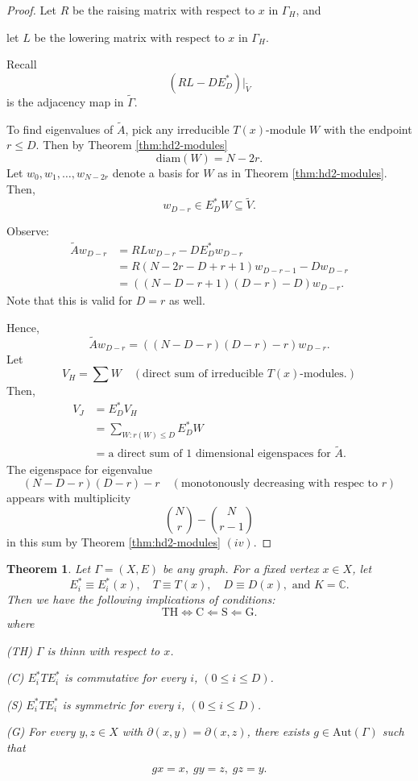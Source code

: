 \documentclass[
]{book}
\newtheorem{theorem}{Theorem}[chapter]
\theoremstyle{definition}
\theoremstyle{definition}
\theoremstyle{definition}
\theoremstyle{definition}
\theoremstyle{remark}
\begin{document}
\begin{proof}
Let \(R\) be the raising matrix with respect to \(x\) in \(\Gamma_H\), and

let \(L\) be the lowering matrix with respect to \(x\) in \(\Gamma_H\).

Recall
\[(RL - DE^*_D) |_{\tilde{V}}\]
is the adjacency map in \(\tilde{\Gamma}\).

To find eigenvalues of \(\tilde{A}\), pick any irreducible \(T(x)\)-module \(W\) with the endpoint \(r\leq D\). Then by Theorem \ref{thm:hd2-modules}
\[\text{diam}(W) = N-2r.\]
Let \(w_0, w_1, \ldots, w_{N-2r}\) denote a basis for \(W\) as in Theorem \ref{thm:hd2-modules}. Then,
\[w_{D-r} \in E^*_DW \subseteq \tilde{V}.\]

Observe:
\begin{align}
\tilde{A}w_{D-r} & = RLw_{D-r} - DE_D^*w_{D-r}\\
& = R(N-2r-D+r+1)w_{D-r-1} - Dw_{D-r}\\
& = ((N-D-r+1)(D-r) - D)w_{D-r}.
\end{align}
Note that this is valid for \(D = r\) as well.

Hence,
\[\tilde{A}w_{D-r}  = ((N-D-r)(D-r)-r)w_{D-r}.\]
Let
\[V_H = \sum W \quad (\text{direct sum of irreducible }T(x)\text{-modules}.)\]
Then,
\begin{align}
V_J & = E_D^*V_H\\
& = \sum_{W:r(W)\leq D} E_D^*W\\
& = \text{a direct sum of 1 dimensional eigenspaces for }\tilde{A}.
\end{align}
The eigenspace for eigenvalue
\[(N-D-r)(D-r)-r \quad (\text{monotonously decreasing with respec to }r)\]
appears with multiplicity
\[\binom{N}{r} - \binom{N}{r-1}\]
in this sum by Theorem \ref{thm:hd2-modules} \((iv)\).
\end{proof}

\begin{theorem}
\protect\hypertarget{thm:thin-condition}{}\label{thm:thin-condition}Let \(\Gamma = (X, E)\) be any graph. For a fixed vertex \(x\in X\), let
\[E_i^*\equiv E_i^*(x), \quad T\equiv T(x), \quad D \equiv D(x), \text{ and } K = \mathbb{C}.\]
Then we have the following implications of conditions:
\[\text{TH} \Leftrightarrow \text{C} \Leftarrow \text{S} \Leftarrow \text{G}.\]
where

(TH) \(\Gamma\) is thinn with respect to \(x\).

(C) \(E^*_iTE^*_i\) is commutative for every \(i\), \((0\leq i \leq D)\).

(S) \(E^*_iTE^*_i\) is symmetric for every \(i\), \((0\leq i \leq D)\).

(G) For every \(y, z\in X\) with \(\partial(x,y) = \partial(x,z)\), there exists \(g\in \mathrm{Aut}(\Gamma)\) such that

\[gx = x, \; gy = z, \; gz = y.\]
\end{theorem}
\end{document}
